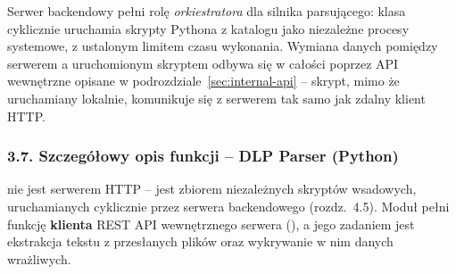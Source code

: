 
Serwer backendowy pełni rolę \emph{orkiestratora} dla silnika parsującego: klasa
 cyklicznie uruchamia skrypty Pythona z katalogu 
jako niezależne procesy systemowe, z ustalonym limitem czasu wykonania. Wymiana danych pomiędzy
serwerem a uruchomionym skryptem odbywa się w całości poprzez API wewnętrzne opisane w
podrozdziale~\ref{sec:internal-api} -- skrypt, mimo że uruchamiany lokalnie, komunikuje się
z serwerem tak samo jak zdalny klient HTTP.

\subsubsection*{3.7. Szczegółowy opis funkcji -- DLP Parser (Python)}


 nie jest serwerem HTTP -- jest zbiorem niezależnych skryptów wsadowych,
uruchamianych cyklicznie przez  serwera backendowego (rozdz.~4.5). Moduł
pełni funkcję \textbf{klienta} REST API wewnętrznego serwera (), a jego zadaniem
jest ekstrakcja tekstu z przesłanych plików oraz wykrywanie w nim danych wrażliwych.


